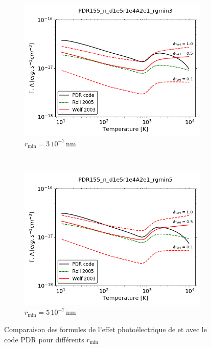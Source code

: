 \begin{figure}[!h]
    \centering
    \begin{subfigure}[t]{0.45\textwidth} %
        \centering \includegraphics[trim = {0 0 0 1cm},clip,width=1\textwidth]{figure/Cl/pePAH/pe_formulae_rgmin3.png}
        \caption{$r_\mathrm{min} = 3\,10^{-7} \, \mathrm{nm}$}
    \end{subfigure}
    ~ 
   \begin{subfigure}[t]{0.45\textwidth} %
        \centering \includegraphics[trim = {0 0 0 1cm},clip,width=1\textwidth]{figure/Cl/pePAH/pe_formulae_rgmin5.png}
        \caption{$r_\mathrm{min} = 5\,10^{-7}\, \mathrm{nm}$}
    \end{subfigure}
    \caption{Comparaison des formules de l'effet photoélectrique de \cite{Rollig2005} et \cite{Wolfire_2003} avec le code PDR pour différents $r_\mathrm{min}$}
    \label{fig:Cl:pePAH}
\end{figure}

